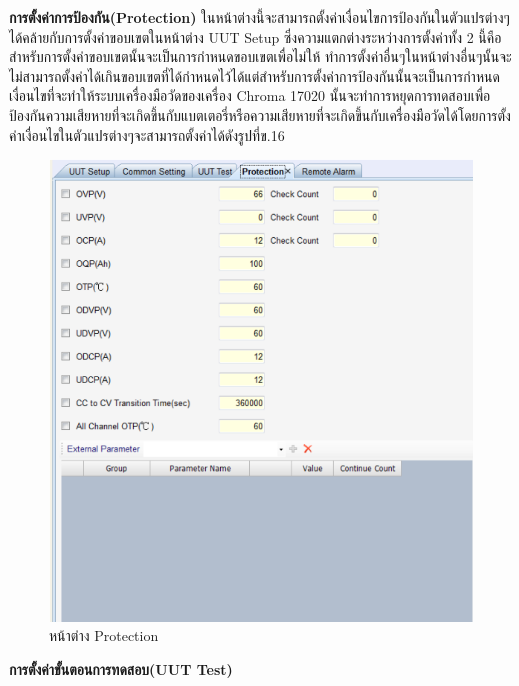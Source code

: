 \textbf{การตั้งค่าการป้องกัน(Protection)}
\newline \hspace*{2cm}
ในหน้าต่างนี้จะสามารถตั้งค่าเงื่อนไขการป้องกันในตัวแปรต่างๆได้คล้ายกับการตั้งค่าขอบเขตในหน้าต่าง UUT Setup ซึ่งความแตกต่างระหว่างการตั้งค่าทั้ง 2 นี้คือสำหรับการตั้งค่าขอบเขตนั้นจะเป็นการกำหนดขอบเขตเพื่อไม่ให้
ทำการตั้งค่าอื่นๆในหน้าต่างอื่นๆนั้นจะไม่สามารถตั้งค่าได้เกินขอบเขตที่ได้กำหนดไว้ได้แต่สำหรับการตั้งค่าการป้องกันนั้นจะเป็นการกำหนดเงื่อนไขที่จะทำให้ระบบเครื่องมือวัดของเครื่อง Chroma 17020 นั้นจะทำการหยุดการทดสอบเพื่อ
ป้องกันความเสียหายที่จะเกิดขึ้นกับแบตเตอรี่หรือความเสียหายที่จะเกิดขึ้นกับเครื่องมือวัดได้โดยการตั้งค่าเงื่อนไขในตัวแปรต่างๆจะสามารถตั้งค่าได้ดังรูปที่ข.16
\begin{center}
	\begin{figure}[H]
		\includegraphics[width=1\linewidth]{Chapters/img/17020_Program/Recipe_Editor/setting_protection.png}
		\centering
		\captionsetup{justification=centering,margin=2cm}
		\caption{หน้าต่าง Protection}
	\end{figure}
\end{center}
\textbf{การตั้งค่าขั้นตอนการทดสอบ(UUT Test)}
